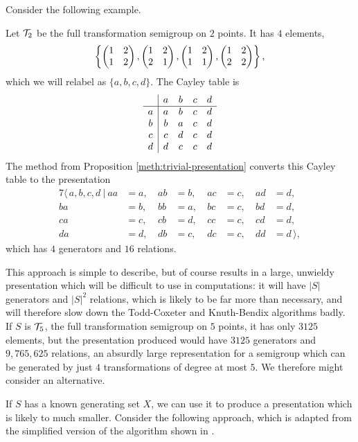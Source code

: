 Consider the following example.

\begin{example}
  Let $\mathcal{T}_2$ be the full transformation semigroup on $2$ points.  It has $4$
  elements,
  $$\left\{\begin{pmatrix} 1 & 2 \\ 1 & 2 \end{pmatrix}, \begin{pmatrix} 1 & 2 \\ 2 & 1 \end{pmatrix}, \begin{pmatrix} 1 & 2 \\ 1 & 1 \end{pmatrix}, \begin{pmatrix} 1 & 2 \\ 2 & 2 \end{pmatrix}\right\},$$
  which we will relabel as $\{a,b,c,d\}$.  The Cayley table is
  $$
  \begin{array}{c | c c c c}
    & a & b & c & d \\
    \hline
    a & a & b & c & d \\
    b & b & a & c & d \\
    c & c & d & c & d \\
    d & d & c & c & d \\
  \end{array}
  $$
  The method from Proposition \ref{meth:trivial-presentation} converts this
  Cayley table to the presentation
  \begin{alignat*}{7}
    \langle\, a,b,c,d ~|~
    aa&=a,\ & ab&=b,\ & ac&=c,\ & ad&=d, \\
    ba&=b,\ & bb&=a,\ & bc&=c,\ & bd&=d, \\
    ca&=c,\ & cb&=d,\ & cc&=c,\ & cd&=d, \\
    da&=d,\ & db&=c,\ & dc&=c,\ & dd&=d\,\rangle,
  \end{alignat*}
  which has $4$ generators and $16$ relations.
\end{example}

This approach is simple to describe, but of course results in a large, unwieldy
presentation which will be difficult to use in computations: it will have $|S|$
generators and $|S|^2$ relations, which is likely to be far more than necessary,
and will therefore slow down the Todd-Coxeter and Knuth-Bendix algorithms badly.
If $S$ is $\mathcal{T}_5$, the full transformation semigroup on $5$ points, it has only
$3125$ elements, but the presentation produced would have $3125$ generators and
$9,765,625$ relations, an absurdly large representation for a semigroup which
can be generated by just $4$ transformations of degree at most $5$.  We
therefore might consider an alternative.

If $S$ has a known generating set $X$, we can use it to produce a presentation
which is likely to much smaller.  Consider the following approach, which is
adapted from the simplified version of the algorithm shown in
\cite[\S 3.1]{froidure-pin}.

